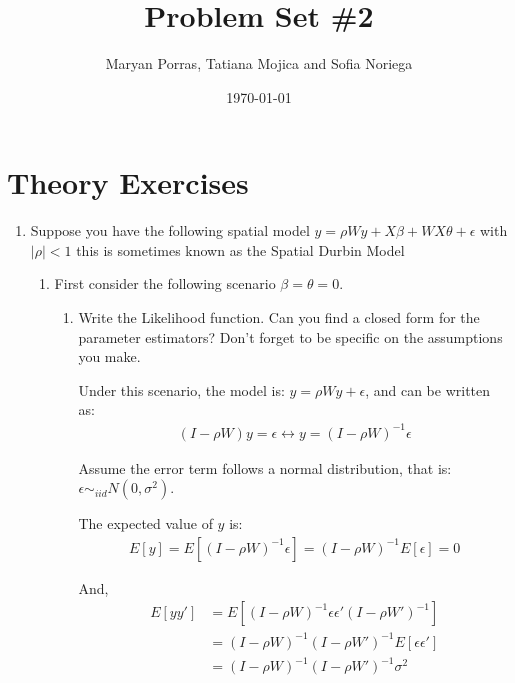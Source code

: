 \documentclass[12pt]{article}
\title{\textbf{Problem Set \#2}} %
\author{Maryan Porras, Tatiana Mojica and Sofia Noriega}
\date{\today} %
\begin{document}
\setlength{\droptitle}{-5em}    
\maketitle


\section{Theory Exercises}

\begin{enumerate}
  \item Suppose you have the following spatial model $y=\rho W y + X\beta + WX\theta  +\epsilon$ with $|\rho|<1$  this is sometimes known as the Spatial Durbin Model
  \begin{enumerate}
    \item First consider the following scenario  $\beta=\theta=0$. 
    \begin{enumerate}
      \item Write the Likelihood function. Can you find a closed form for the parameter estimators? Don't forget to be specific on the assumptions you make.
      
      Under this scenario, the model is: $y=\rho W y +\epsilon$, and can be written as:
      \begin{align*}
          (I-\rho W)y = \epsilon \longleftrightarrow y = (I-\rho W)^{-1} \epsilon
      \end{align*}
      
      Assume the error term follows a normal distribution, that is: $\epsilon \sim_{iid} N(0,\sigma^2)$.
      
      The expected value of $y$ is:
      \begin{align}
          E[y] = E[(I-\rho W)^{-1} \epsilon] = (I-\rho W)^{-1} E[ \epsilon ] = 0 \label{ExpectedValue} 
      \end{align}
      
      And, 
      \begin{align}
          E[yy'] &= E[(I-\rho W)^{-1} \epsilon \epsilon' (I-\rho W')^{-1}] \nonumber\\
          &= (I-\rho W)^{-1} (I-\rho W')^{-1} E[ \epsilon \epsilon' ] \nonumber\\
          &= (I-\rho W)^{-1} (I-\rho W')^{-1} \sigma^2 \label{Squared}
      \end{align}
      

\end{enumerate}
\end{enumerate}
\end{enumerate}
\end{document}
